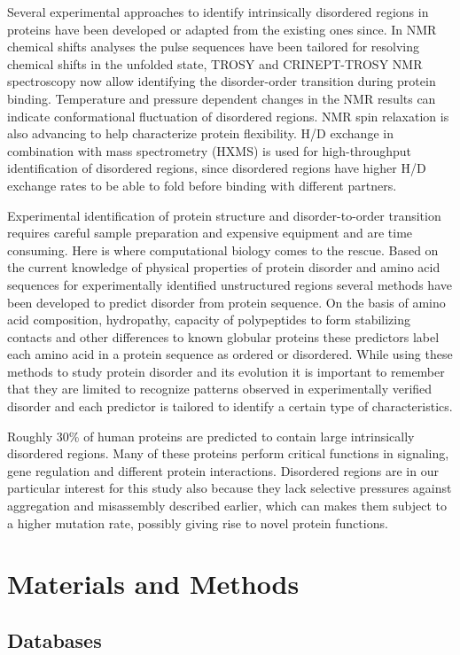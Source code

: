 \documentclass[11pt, a4paper,oneside]{report}
\newcommand{\mychapter}[2]{
    \setcounter{chapter}{#1}
    \setcounter{section}{0}
    \chapter*{#2}
    \addcontentsline{toc}{chapter}{#2}
}
\begin{document}
Several experimental approaches to identify intrinsically disordered regions in proteins have been developed or adapted from the existing ones since. In NMR chemical shifts analyses the pulse sequences have been tailored for resolving chemical shifts in the unfolded state, TROSY and CRINEPT-TROSY NMR spectroscopy now allow identifying the disorder-order transition during protein binding. Temperature and pressure dependent changes in the NMR results can indicate conformational fluctuation of disordered regions. NMR spin relaxation is also advancing to help characterize protein flexibility. H/D exchange in combination with mass spectrometry (HXMS) is used for high-throughput identification of disordered regions, since disordered regions have higher H/D exchange rates to be able to fold before binding with different partners\cite{Balasubramaniam2013}.  

Experimental identification of protein structure and disorder-to-order transition requires careful sample preparation and expensive equipment and are time consuming.  Here is where computational biology comes to the rescue. Based on the current knowledge of physical properties of protein disorder and amino acid sequences for experimentally identified unstructured regions several methods have been developed to predict disorder from protein sequence\cite{Ferron2006}. On the basis of amino acid composition, hydropathy, capacity of polypeptides to form stabilizing contacts and other differences to known globular proteins these predictors label each amino acid in a protein sequence as ordered or disordered. While using these methods to study protein disorder and its evolution it is important to remember that they are limited to recognize patterns observed in experimentally verified disorder and each predictor is tailored to identify a certain type of characteristics\cite{Dunker2011}.

Roughly 30\% of human proteins are predicted to contain large intrinsically disordered regions\cite{Ward2004}. Many of these proteins perform critical functions in signaling, gene regulation and different protein interactions\cite{Iakoucheva2002}. Disordered regions are in our particular interest for this study also because they lack selective pressures against aggregation and misassembly described earlier, which can makes them subject to a higher mutation rate, possibly giving rise to novel protein functions.   

\mychapter{2}{Materials and Methods}
\section{Databases}
\end{document}
